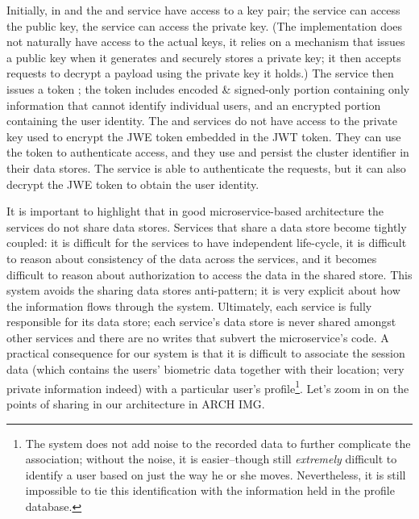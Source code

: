 Initially, in  and  the  and  service have access to a key pair; the  service can access the public key, the  service can access the private key. (The implementation does not naturally have access to the actual keys, it relies on a mechanism that issues a public key when it generates and securely stores a private key; it then accepts requests to decrypt a payload using the private key it holds.) The  service then issues a token ; the token includes encoded \& signed-only portion containing only information that cannot identify individual users, and an encrypted portion containing the user identity. The   and   services do not have access to the private key used to encrypt the JWE token embedded in the JWT token. They can use the token to authenticate access, and they use and persist the cluster identifier in their data stores. The   service is able to authenticate the requests, but it can also decrypt the JWE token to obtain the user identity.

It is important to highlight that in good microservice-based architecture the services do not share data stores. Services that share a data store become tightly coupled: it is difficult for the services to have independent life-cycle, it is difficult to reason about consistency of the data across the services, and it becomes difficult to reason about authorization to access the data in the shared store.
This system avoids the sharing data stores anti-pattern; it is very explicit about how the information flows through the system. Ultimately, each service is fully responsible for its data store; each service's data store is never shared amongst other services and there are no writes that subvert the microservice's code.
A practical consequence for our system is that it is difficult to associate the session data (which contains the users' biometric data together with their location; very private information indeed) with a particular user's profile\footnote{The system does not add noise to the recorded data to further complicate the association; without the noise, it is easier--though still \emph{extremely} difficult to identify a user based on just the way he or she moves. Nevertheless, it is still impossible to tie this identification with the information held in the profile database.}. Let's zoom in on the points of sharing in our architecture in ARCH IMG.

\printbibliography

 